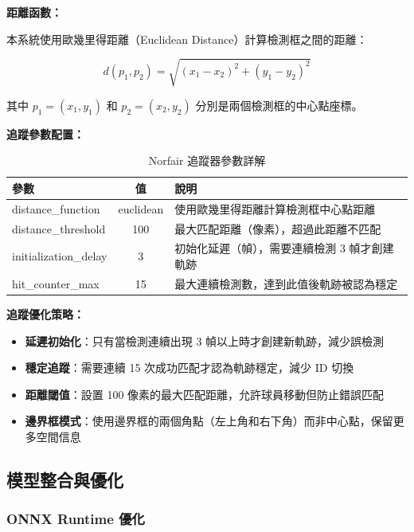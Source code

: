 \documentclass[a4paper,14pt,oneside]{article}
\begin{document}
\textbf{距離函數：}

本系統使用歐幾里得距離（Euclidean Distance）計算檢測框之間的距離：

\begin{equation}
d(p_1, p_2) = \sqrt{(x_1 - x_2)^2 + (y_1 - y_2)^2}
\end{equation}

其中 $p_1 = (x_1, y_1)$ 和 $p_2 = (x_2, y_2)$ 分別是兩個檢測框的中心點座標。

\textbf{追蹤參數配置：}

\begin{table}[H]
    \centering
    \caption{Norfair 追蹤器參數詳解}
    \begin{tabular}{|l|c|p{6cm}|}
        \hline
        \textbf{參數} & \textbf{值} & \textbf{說明} \\
        \hline
        distance\_function & euclidean & 使用歐幾里得距離計算檢測框中心點距離 \\
        \hline
        distance\_threshold & 100 & 最大匹配距離（像素），超過此距離不匹配 \\
        \hline
        initialization\_delay & 3 & 初始化延遲（幀），需要連續檢測 3 幀才創建軌跡 \\
        \hline
        hit\_counter\_max & 15 & 最大連續檢測數，達到此值後軌跡被認為穩定 \\
        \hline
    \end{tabular}
\end{table}

\textbf{追蹤優化策略：}

\begin{itemize}
    \item \textbf{延遲初始化}：只有當檢測連續出現 3 幀以上時才創建新軌跡，減少誤檢測
    \item \textbf{穩定追蹤}：需要連續 15 次成功匹配才認為軌跡穩定，減少 ID 切換
    \item \textbf{距離閾值}：設置 100 像素的最大匹配距離，允許球員移動但防止錯誤匹配
    \item \textbf{邊界框模式}：使用邊界框的兩個角點（左上角和右下角）而非中心點，保留更多空間信息
\end{itemize}

\subsection{模型整合與優化}

\subsubsection{ONNX Runtime 優化}
\end{document}
